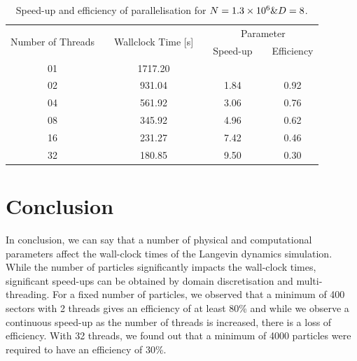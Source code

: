 \documentclass[11pt, oneside]{article}
\begin{document}
                
                \begin{table}[h]
  \caption{Speed-up and efficiency of parallelisation for $N = \num{1.3d6} \text{\&} D = 8$.}
  \label{tab:measures}
  \centering
  \begin{tabular}{ccccccc}
    \toprule
    \multirow{2}{*}{Number of Threads} &\phantom{abc} & \multirow{2}{*}{Wallclock Time [s]} &\phantom{abc} & \multicolumn{3}{c}{Parameter} \\
    \cmidrule{5-7}
    &\phantom{abc} & & \phantom{abc} & Speed-up & \phantom{abc} & {Efficiency}\\
    \midrule
    01 && 1717.20 && {} && {} \\
    02 && 931.04 && 1.84 && 0.92 \\
    04 && 561.92 && 3.06 && 0.76 \\
    08 && 345.92 && 4.96 && 0.62 \\
    16 && 231.27 && 7.42 && 0.46 \\
    32 && 180.85 && 9.50 && 0.30 \\
    \bottomrule
  \end{tabular}
\end{table}


                
\section{Conclusion}
     In conclusion, we can say that a number of physical and computational parameters affect the wall-clock times of the Langevin dynamics simulation. While the number of particles significantly impacts the wall-clock times, significant speed-ups can be obtained by domain discretisation and multi-threading. For a fixed number of particles, we observed that a minimum of 400 sectors with 2 threads gives an efficiency of at least 80\% and while we observe a continuous speed-up as the number of threads is increased, there is a loss of efficiency. With 32 threads, we found out that a minimum of 4000 particles were required to have an efficiency of 30\%.         



\end{document}
